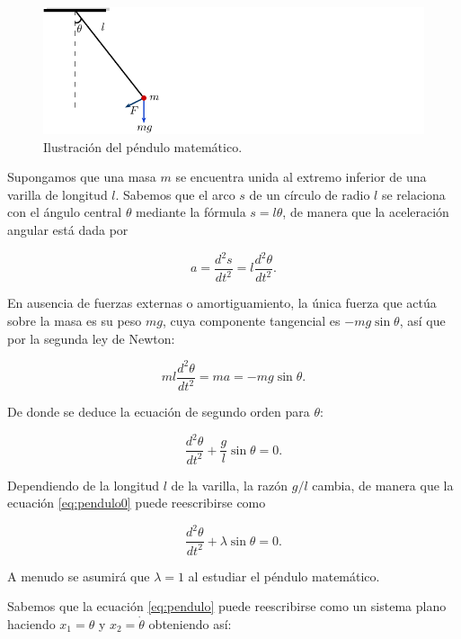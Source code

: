 \begin{example} \label{ej:pendulo}

\begin{figure}[!hb] \centering
	\includegraphics[scale=1.0]{figures/pendulum.pdf}
	\caption{Ilustración del péndulo matemático.}
	\label{fig:pendulo}
\end{figure}

Supongamos que una masa $m$ se encuentra unida al extremo inferior de una varilla de longitud $l$. Sabemos que el arco $s$ de un círculo de radio $l$ se relaciona con el ángulo central $\theta$ mediante la fórmula $s = l\theta$, de manera que la aceleración angular está dada por

$$ a = \dfrac{d^2s}{dt^2} = l \dfrac{d^2\theta}{dt^2}.$$

En ausencia de fuerzas externas o amortiguamiento, la única fuerza que actúa sobre la masa es su peso $mg$, cuya componente tangencial es $-mg\sin\theta$, así que por la segunda ley de Newton:

$$ ml \dfrac{d^2\theta}{dt^2} = ma = -mg\sin\theta.$$

De donde se deduce la ecuación de segundo orden para $\theta$:

\begin{equation} \label{eq:pendulo0}
	\dfrac{d^2\theta}{dt^2} + \frac{g}{l}\sin\theta = 0.
\end{equation}

Dependiendo de la longitud $l$ de la varilla, la razón $g/l$ cambia, de manera que la ecuación \ref{eq:pendulo0} puede reescribirse como

\begin{equation} \label{eq:pendulo}
	\dfrac{d^2\theta}{dt^2} + \lambda\sin\theta = 0.
\end{equation}

A menudo se asumirá que $\lambda = 1$ al estudiar el péndulo matemático.

Sabemos que la ecuación \ref{eq:pendulo} puede reescribirse como un sistema plano haciendo $x_1 = \theta$ y $x_2 = \dot{\theta}$ obteniendo así:


\end{example}
